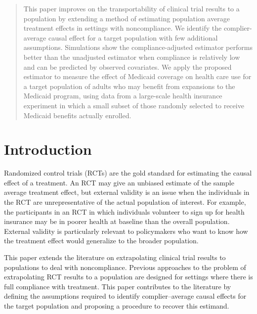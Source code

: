 \documentclass[hidelinks,12pt]{article}
\begin{document}
\begin{singlespace} %
\maketitle  

\thispagestyle{empty}
\begin{abstract}  
\noindent 
This paper {\color{red} improves on the transportability of clinical trial results to a population by extending a method of estimating population average treatment effects in settings with noncompliance.} We identify the complier-average causal effect for {\color{red}a} target population with few additional assumptions. Simulations show the compliance-adjusted estimator performs better than the unadjusted estimator when compliance is relatively low and can be predicted by observed covariates. We apply the proposed estimator to measure the effect of Medicaid coverage on health care use for a target population of adults who may benefit from expansions to the Medicaid program{\color{red}, using} data from a large-scale health insurance experiment in which a small subset of those randomly selected to receive Medicaid benefits actually enrolled.
\end{abstract}	

\end{singlespace}
\pagebreak
\setcounter{page}{1} %

\vspace{20mm}

\section{Introduction}\label{intro}
Randomized control trials (RCTs) are the gold standard for estimating the causal effect of a treatment. An RCT may give an unbiased estimate of the sample average treatment effect, but external validity is an issue when the individuals in the RCT are unrepresentative of the actual population of interest. For example, the participants in an RCT in which individuals volunteer to sign up for health insurance may be in poorer health at baseline than the overall population. External validity is particularly relevant to policymakers who want to know how the treatment effect would generalize to the broader population. 

{\color{red}This paper extends the literature on extrapolating clinical trial results to populations to deal with noncompliance. Previous approaches to the problem of extrapolating RCT results to a population \citep{ImaKinStu08, stuart2011use, Hartman} are designed for settings where there is full compliance with treatment. This paper contributes to the literature by defining the assumptions required to identify complier--average causal effects for the target population and proposing a procedure to recover this estimand.} 
\end{document}
